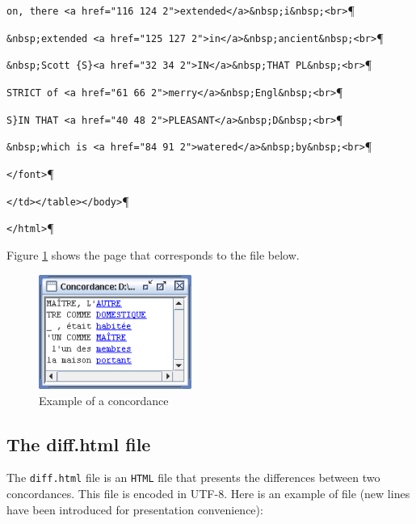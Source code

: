 \verb$on, there <a href="116 124 2">extended</a>&nbsp;i&nbsp;<br>$\P

\verb$&nbsp;extended <a href="125 127 2">in</a>&nbsp;ancient&nbsp;<br>$\P

\verb$&nbsp;Scott {S}<a href="32 34 2">IN</a>&nbsp;THAT PL&nbsp;<br>$\P

\verb$STRICT of <a href="61 66 2">merry</a>&nbsp;Engl&nbsp;<br>$\P

\verb+S}IN THAT <a href="40 48 2">PLEASANT</a>&nbsp;D&nbsp;<br>+\P

\verb+&nbsp;which is <a href="84 91 2">watered</a>&nbsp;by&nbsp;<br>+\P

\verb$</font>$\P

\verb$</td></table></body>$\P

\verb$</html>$\P


\bigskip
\noindent Figure \ref{fig-example-concordance-2} shows the page that
corresponds to the file below.

\begin{figure}[!h]
\begin{center}
\includegraphics[width=5cm]{resources/img/fig10-2.png}
\caption{Example of a concordance\label{fig-example-concordance-2}}
\end{center}
\end{figure}



\subsection{The diff.html file}
The \verb+diff.html+ file is an \verb+HTML+ file that presents the differences
between two concordances. This file is encoded in UTF-8. Here is an
example of file (new lines have been introduced for presentation convenience):


